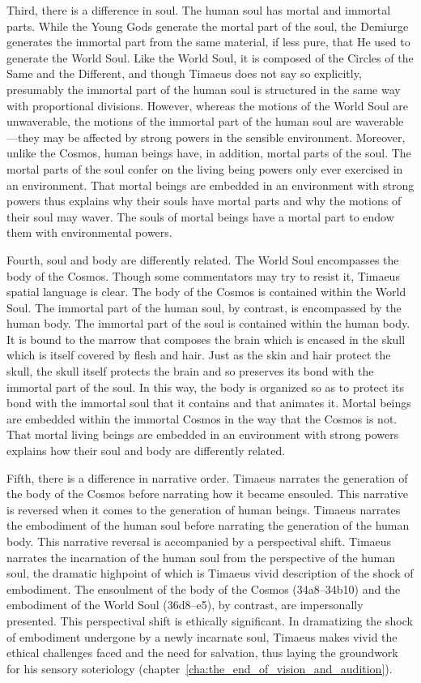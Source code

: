 Third, there is a difference in soul. The human soul has mortal and immortal parts. While the Young Gods generate the mortal part of the soul, the Demiurge generates the immortal part from the same material, if less pure, that He used to generate the World Soul. Like the World Soul, it is composed of the Circles of the Same and the Different, and though Timaeus does not say so explicitly, presumably the immortal part of the human soul is structured in the same way with proportional divisions. However, whereas the motions of the World Soul are unwaverable, the motions of the immortal part of the human soul are waverable---they may be affected by strong powers in the sensible environment. Moreover, unlike the Cosmos, human beings have, in addition, mortal parts of the soul. The mortal parts of the soul confer on the living being powers only ever exercised in an environment. That mortal beings are embedded in an environment with strong powers thus explains why their souls have mortal parts and why the motions of their soul may waver. The souls of mortal beings have a mortal part to endow them with environmental powers.

Fourth, soul and body are differently related. The World Soul encompasses the body of the Cosmos. Though some commentators may try to resist it, Timaeus spatial language is clear. The body of the Cosmos is contained within the World Soul. The immortal part of the human soul, by contrast, is encompassed by the human body. The immortal part of the soul is contained within the human body. It is bound to the marrow that composes the brain which is encased in the skull which is itself covered by flesh and hair. Just as the skin and hair protect the skull, the skull itself protects the brain and so preserves its bond with the immortal part of the soul. In this way, the body is organized so as to protect its bond with the immortal soul that it contains and that animates it. Mortal beings are embedded within the immortal Cosmos in the way that the Cosmos is not. That mortal living beings are embedded in an environment with strong powers explains how their soul and body are differently related.

Fifth, there is a difference in narrative order. Timaeus narrates the generation of the body of the Cosmos before narrating how it became ensouled. This narrative is reversed when it comes to the generation of human beings. Timaeus narrates the embodiment of the human soul before narrating the generation of the human body. This narrative reversal is accompanied by a perspectival shift. Timaeus narrates the incarnation of the human soul from the perspective of the human soul, the dramatic highpoint of which is Timaeus vivid description of the shock of embodiment. The ensoulment of the body of the Cosmos (34a8--34b10) and the embodiment of the World Soul (36d8--e5), by contrast, are impersonally presented. This perspectival shift is ethically significant. In dramatizing the shock of embodiment undergone by a newly incarnate soul, Timaeus makes vivid the ethical challenges faced and the need for salvation, thus laying the groundwork for his sensory soteriology (chapter~\ref{cha:the_end_of_vision_and_audition}).


